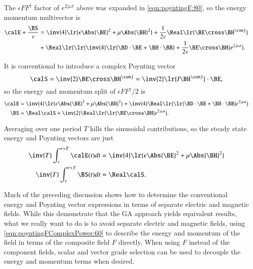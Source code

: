 The \( \epsilon F F^\dagger \) factor of \( e^{2 j \omega t} \) above was expanded in \cref{eqn:poyntingF:80}, so the energy momentum multivector is
\begin{dmath}\label{eqn:poyntingFComplexPower:220}
\begin{aligned}
\calE + \frac{\BS}{v}
&=
\inv{4} \lr{
\epsilon \Abs{\BE}^2 + \mu \Abs{\BH}^2 }
+
\frac{1}{2 v} \Real \lr{
\BE \cross \BH^\conj
} \\
&+
\Real
\lr{
   \lr{
     \inv{4} \lr{ \BD \cdot \BE + \BH \cdot \BB}
   + \frac{1}{2 v} \BE \cross \BH
   }
   e^{2 j \omega t }
}.
\end{aligned}
\end{dmath}

It is conventional to introduce a complex Poynting vector
\begin{equation}\label{eqn:poyntingFComplexPower:240}
\calS = \inv{2} \BE \cross \BH^\conj = \inv{2} \lr{ I \BH^\conj } \cdot \BE,
\end{equation}
so the energy and momentum split of \( \epsilon F F^\dagger/2 \) is
\begin{dmath}\label{eqn:poyntingFComplexPower:260}
\begin{aligned}
\calE &=
\inv{4} \lr{
\epsilon \Abs{\BE}^2 + \mu \Abs{\BH}^2 }
+
\inv{4} \Real
\lr{
   \lr{ \BD \cdot \BE + \BH \cdot \BB}
   e^{2 j \omega t }
} \\
\BS &= \Real \calS
+
\inv{2} \Real
\lr{
\lr{ \BE \cross \BH }
   e^{2 j \omega t }
}.
\end{aligned}
\end{dmath}

Averaging over one period \( T \) kills the sinusoidal contributions, so the steady state energy and Poynting vectors are just
\begin{dmath}\label{eqn:poyntingFComplexPower:280}
\begin{aligned}
\inv{T} \int_\tau^{\tau+T} \calE(t) dt &=
\inv{4} \lr{
\epsilon \Abs{\BE}^2 + \mu \Abs{\BH}^2 } \\
\inv{T} \int_\tau^{\tau+T} \BS(t) dt &= \Real \calS.
\end{aligned}
\end{dmath}

Much of the preceding discussion shows how to determine the conventional energy and Poynting vector expressions in terms of separate electric and magnetic fields.
While this demonstrate that the GA approach yields equivalent results, what we really want to do is to
avoid separate electric and magnetic fields, using
\cref{eqn:poyntingFComplexPower:60} to describe the energy and momentum of the field in terms of the composite field \( F \) directly.
When using \( F \) instead of the component fields,
scalar and vector grade selection can be used to decouple the energy and momentum terms when desired.
